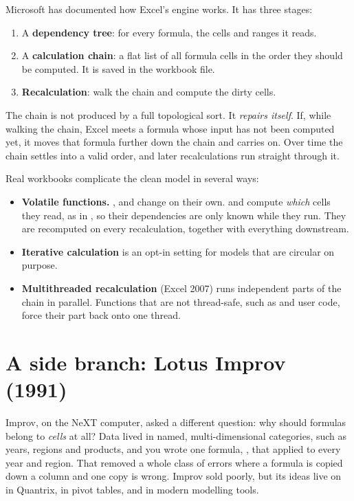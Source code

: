 \documentclass[11pt]{article}
\begin{document}
Microsoft has documented how Excel's engine works. It has three stages:

\begin{enumerate}[label=\arabic*.]
\item A \textbf{dependency tree}: for every formula, the cells and ranges
  it reads.
\item A \textbf{calculation chain}: a flat list of all formula cells in
  the order they should be computed. It is saved in the workbook file.
\item \textbf{Recalculation}: walk the chain and compute the dirty cells.
\end{enumerate}

The chain is not produced by a full topological sort. It \emph{repairs
itself}. If, while walking the chain, Excel meets a formula whose input has
not been computed yet, it moves that formula further down the chain and
carries on. Over time the chain settles into a valid order, and later
recalculations run straight through it.

Real workbooks complicate the clean model in several ways:

\begin{itemize}
\item \textbf{Volatile functions.} ,  and 
  change on their own.  and  compute \emph{which}
  cells they read, as in , so their dependencies
  are only known while they run. They are recomputed on every
  recalculation, together with everything downstream.
\item \textbf{Iterative calculation} is an opt-in setting for models that
  are circular on purpose.
\item \textbf{Multithreaded recalculation} (Excel 2007) runs independent
  parts of the chain in parallel. Functions that are not thread-safe, such
  as  and user code, force their part back onto one thread.
\end{itemize}

\section{A side branch: Lotus Improv (1991)}

Improv, on the NeXT computer, asked a different question: why should
formulas belong to \emph{cells} at all? Data lived in named,
multi-dimensional categories, such as years, regions and products, and you
wrote one formula, , that applied to every
year and region. That removed a whole class of errors where a formula is
copied down a column and one copy is wrong. Improv sold poorly, but its
ideas live on in Quantrix, in pivot tables, and in modern modelling tools.
\end{document}
